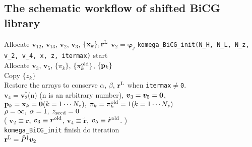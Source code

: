 \documentclass[12pt,titlepage]{article}
\renewenvironment{leftbar}{%
  \def\FrameCommand{\vrule width 1pt \hspace{0pt}}%
  \MakeFramed {\advance\hsize-\width \FrameRestore}}%
 {\endMakeFramed}
\begin{document}
\subsection{The schematic workflow of shifted BiCG library}%

\noindent
Allocate ${\boldsymbol v}_{1 2}$, ${\boldsymbol v}_{1 3}$, 
${\boldsymbol v}_2$, ${\boldsymbol v}_3$, $\{{\bf x}_k\}, {\bf r}^{\rm L}$
${\boldsymbol v}_2 = {\boldsymbol \varphi_j}$
\vspace{-1em}
\begin{leftbar}
  \noindent
  \verb|komega_BiCG_init(N_H, N_L, N_z, v_2, v_4, x, z, itermax)| start
  \\ \hspace{0.5cm}
  Allocate ${\boldsymbol v}_3$, ${\boldsymbol v}_5$, $\{\pi_k\}$, $\{\pi_k^{\rm old}\}$, $\{{\bf p}_k\}$
  \\ \hspace{0.5cm}
  Copy $\{z_k\}$
  \\ \hspace{0.5cm}
  Restore the arrays to conserve $\alpha$, $\beta$, ${\bf r}^{\rm L}$ when  \verb|itermax|$\neq$\verb|0|.
  \\ \hspace{0.5cm}
  ${\boldsymbol v}_4 = {\boldsymbol v}_2^*$(n) (n is an arbitrary number),
  ${\boldsymbol v}_3 = {\boldsymbol v}_5 = {\bf 0}$,
  \\ \hspace{0.5cm}
  ${\bf p}_{k} = {\bf x}_k = {\bf 0}(k=1 \cdots N_z),\; \pi_k=\pi_k^{\rm old} = 1(k=1 \cdots N_z)$ 
  \\ \hspace{0.5cm}
  $\rho = \infty,\; \alpha = 1,\; z_{\rm seed}=0$ 
  \\ \hspace{0.5cm}
  (
  ${\boldsymbol v}_2 \equiv {\boldsymbol r}$, 
  ${\boldsymbol v}_3 \equiv {\boldsymbol r}^{\rm old}$,
  ${\boldsymbol v}_4 \equiv {\tilde {\boldsymbol r}}$, 
  ${\boldsymbol v}_5 \equiv {\tilde {\boldsymbol r}}^{\rm old}$. )
  \\
  \verb|komega_BiCG_init| finish
\end{leftbar}
\vspace{-1em}
\noindent
do iteration
\\\hspace{0.5cm}
${\bf r}^{\rm L} = {\hat P}^\dagger {\boldsymbol v}_2$
\\\hspace{0.5cm}
\end{document}
